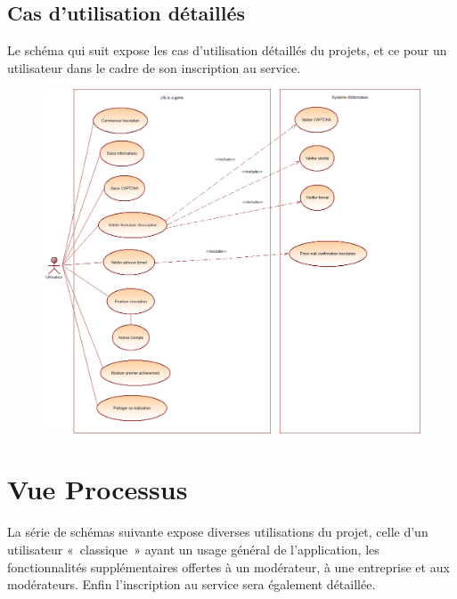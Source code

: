 \documentclass{life-fr}
\begin{document}
\section{Cas d'utilisation détaillés}

Le schéma qui suit expose les cas d'utilisation détaillés du projets, et ce pour un utilisateur dans le cadre de son inscription au service.

\begin{figure}[H]
  \begin{center}
    \includegraphics[width=17cm]{img/use_case_detailles.png}
  \end{center}
\end{figure}


\chapter{Vue Processus}

La série de schémas suivante expose diverses utilisations du projet, celle d'un utilisateur «~classique~» ayant un usage général de l'application, les fonctionnalités supplémentaires offertes à un modérateur, à une entreprise et aux modérateurs. Enfin l'inscription au service sera également détaillée.
\end{document}
